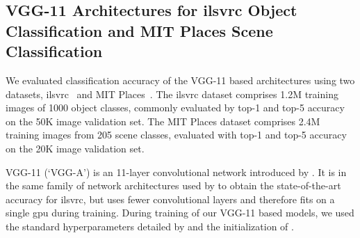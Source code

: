 \documentclass[thesis]{subfiles}
\begin{document}
    \subsection[VGG-11 Architectures for \acrshort{ilsvrc} Object Classification and MIT Places Scene Classification]{VGG-11 Architectures for \acrshort{ilsvrc} Object\\Classification and MIT Places Scene Classification}\label{vggresults}
    We evaluated classification accuracy of the VGG-11 based architectures using two datasets, \gls{ilsvrc}~\citep{Jia2014} and MIT Places~\citep{zhou2014learning}. The \gls{ilsvrc} dataset comprises 1.2M training images of 1000 object classes, commonly evaluated by top-1 and top-5 accuracy on the 50K image validation set. The MIT Places dataset comprises 2.4M training images from 205 scene classes, evaluated with top-1 and top-5 accuracy on the 20K image validation set.
    
    VGG-11 (`VGG-A') is an 11-layer convolutional network introduced by \citet{Simonyan2014verydeep}. It is in the same family of network architectures used by \citet{Simonyan2014verydeep,He2015b} to obtain the state-of-the-art accuracy for \gls{ilsvrc}, but uses fewer convolutional layers and therefore fits on a single \gls{gpu} during training. During training of our VGG-11 based models, we used the standard hyperparameters detailed by \citet{Simonyan2014verydeep} and the initialization of \citet{He2015b}.
    
%    
\end{document}
